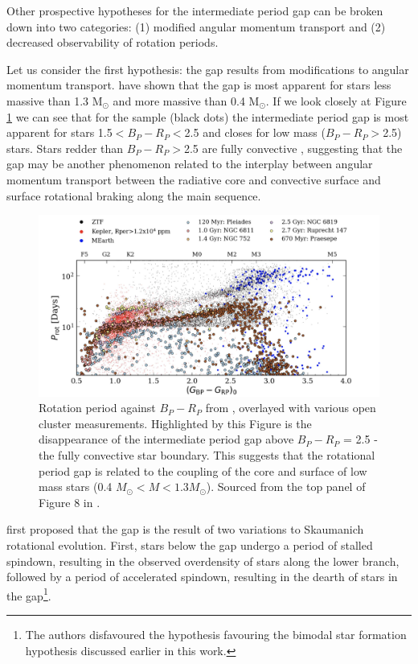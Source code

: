 Other prospective hypotheses for the intermediate period gap can be broken down into two categories: (1) modified angular momentum transport and (2) decreased observability of rotation periods.

Let us consider the first hypothesis: the gap results from modifications to angular momentum transport.
\citet{lu_bridging_2022} have shown that the gap is most apparent for stars less massive than 1.3 M$_{\odot}$ and more massive than 0.4 M$_{\odot}$.
If we look closely at Figure \ref{fig:ztf_comp} we can see that for the \ZTF{} sample (black dots) the intermediate period gap is most apparent for stars 1.5$<B_P-R_P <$2.5 and closes for low mass ($B_P-R_P >$2.5) stars.
Stars redder than $B_P-R_P >$2.5 are fully convective \citep{amard_first_2019}, suggesting that the gap may be another phenomenon related to the interplay between angular momentum transport between the radiative core and convective surface and surface rotational braking along the main sequence.

\begin{figure}[h]
    \includegraphics[width=\textwidth]{Figures/intro_figures/ztf_comp.png}
    \caption{Rotation period against \gaia{} $B_P - R_P$ from \kepler{}, \ZTF{} overlayed with various open cluster measurements. Highlighted by this Figure is the disappearance of the intermediate period gap above $B_P-R_P$ = 2.5 - the fully convective star boundary. This suggests that the rotational period gap is related to the coupling of the core and surface of low mass stars (0.4 $M_{\odot}<M<1.3M_{\odot}$). Sourced from the top panel of Figure 8 in \citep{lu_bridging_2022}.}
    \label{fig:ztf_comp}
\end{figure}

\citet{mcquillan_rotation_2014} first proposed that the gap is the result of two variations to Skaumanich rotational evolution.
First, stars below the gap undergo a period of stalled spindown, resulting in the observed overdensity of stars along the lower branch, followed by a period of accelerated spindown, resulting in the dearth of stars in the gap\footnote{The authors disfavoured the hypothesis favouring the bimodal star formation hypothesis discussed earlier in this work.}.

